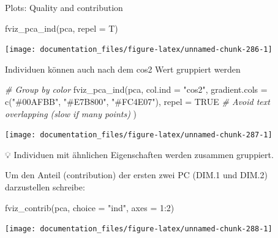 \documentclass[
]{article}
\newenvironment{Shaded}{\begin{snugshade}}{\end{snugshade}}
\newcommand{\AttributeTok}[1]{\textcolor[rgb]{0.77,0.63,0.00}{#1}}
\newcommand{\CommentTok}[1]{\textcolor[rgb]{0.56,0.35,0.01}{\textit{#1}}}
\newcommand{\ConstantTok}[1]{\textcolor[rgb]{0.00,0.00,0.00}{#1}}
\newcommand{\DecValTok}[1]{\textcolor[rgb]{0.00,0.00,0.81}{#1}}
\newcommand{\FunctionTok}[1]{\textcolor[rgb]{0.00,0.00,0.00}{#1}}
\newcommand{\NormalTok}[1]{#1}
\newcommand{\SpecialCharTok}[1]{\textcolor[rgb]{0.00,0.00,0.00}{#1}}
\newcommand{\StringTok}[1]{\textcolor[rgb]{0.31,0.60,0.02}{#1}}
\begin{document}
Plots: Quality and contribution

\begin{Shaded}
\begin{Highlighting}[]
\FunctionTok{fviz\_pca\_ind}\NormalTok{(pca, }\AttributeTok{repel =}\NormalTok{ T)}
\end{Highlighting}
\end{Shaded}

\begin{center}\texttt{[image: documentation\_files/figure-latex/unnamed-chunk-286-1]} \end{center}

Individuen können auch nach dem cos2 Wert gruppiert werden

\begin{Shaded}
\begin{Highlighting}[]
\CommentTok{\# Group by color}
\FunctionTok{fviz\_pca\_ind}\NormalTok{(pca, }\AttributeTok{col.ind =} \StringTok{"cos2"}\NormalTok{, }
             \AttributeTok{gradient.cols =} \FunctionTok{c}\NormalTok{(}\StringTok{"\#00AFBB"}\NormalTok{, }\StringTok{"\#E7B800"}\NormalTok{, }\StringTok{"\#FC4E07"}\NormalTok{),}
             \AttributeTok{repel =} \ConstantTok{TRUE} \CommentTok{\# Avoid text overlapping (slow if many points)}
\NormalTok{             )}
\end{Highlighting}
\end{Shaded}

\begin{center}\texttt{[image: documentation\_files/figure-latex/unnamed-chunk-287-1]} \end{center}

💡 Individuen mit ähnlichen Eigenschaften werden zusammen gruppiert.

Um den Anteil (contribution) der ersten zwei PC (DIM.1 und DIM.2) darzustellen schreibe:

\begin{Shaded}
\begin{Highlighting}[]
\FunctionTok{fviz\_contrib}\NormalTok{(pca, }\AttributeTok{choice =} \StringTok{"ind"}\NormalTok{, }\AttributeTok{axes =} \DecValTok{1}\SpecialCharTok{:}\DecValTok{2}\NormalTok{)}
\end{Highlighting}
\end{Shaded}

\begin{center}\texttt{[image: documentation\_files/figure-latex/unnamed-chunk-288-1]} \end{center}
\end{document}
